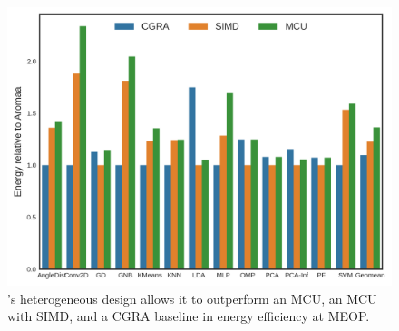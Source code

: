 \begin{figure}
\centering
\includegraphics[width=\linewidth]{./figs/comparison_vs_baselines.png}
\caption{\small
    \arch{}'s heterogeneous design allows it to outperform an MCU, an MCU with
    SIMD, and a CGRA baseline in energy efficiency at MEOP.
}
\label{fig:vs_baselines}
\end{figure}

